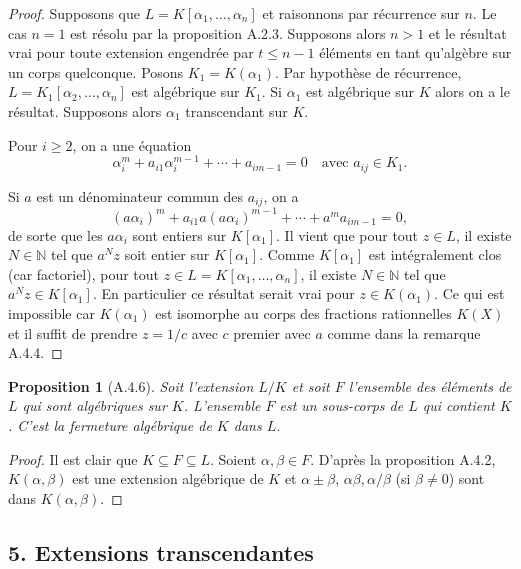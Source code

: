 \documentclass[12pts,a4paper]{report}
\newtheorem{proposition}{Proposition}
\begin{document}
\begin{proof}
Supposons que \( L = K[\alpha_1, \ldots, \alpha_n] \) et raisonnons par récurrence sur \( n \). Le cas \( n = 1 \) est résolu par la proposition A.2.3. Supposons alors \( n > 1 \) et le résultat vrai pour toute extension engendrée par \( t \leq n - 1 \) éléments en tant qu'algèbre sur un corps quelconque. Posons \( K_1 = K(\alpha_1) \). Par hypothèse de récurrence, \( L = K_1[\alpha_2, \ldots, \alpha_n] \) est algébrique sur \( K_1 \). Si \( \alpha_1 \) est algébrique sur \( K \) alors on a le résultat. Supposons alors \( \alpha_1 \) transcendant sur \( K \).

Pour \( i \geq 2 \), on a une équation
\[
\alpha_i^m + a_{i1}\alpha_i^{m-1} + \cdots + a_{im-1} = 0 \quad \text{avec } a_{ij} \in K_1.
\]

Si \( a \) est un dénominateur commun des \( a_{ij} \), on a
\[
(a\alpha_i)^m + a_{i1}a(a\alpha_i)^{m-1} + \cdots + a^{m}a_{im-1} = 0,
\]
de sorte que les \( a\alpha_i \) sont entiers sur \( K[\alpha_1] \). Il vient que pour tout \( z \in L \), il existe \( N \in \mathbb{N} \) tel que \( a^N z \) soit entier sur \( K[\alpha_1] \). Comme \( K[\alpha_1] \) est intégralement clos (car factoriel), pour tout \( z \in L = K[\alpha_1, \ldots, \alpha_n] \), il existe \( N \in \mathbb{N} \) tel que \( a^N z \in K[\alpha_1] \). En particulier ce résultat serait vrai pour \( z \in K(\alpha_1) \). Ce qui est impossible car \( K(\alpha_1) \) est isomorphe au corps des fractions rationnelles \( K(X) \) et il suffit de prendre \( z = 1/c \) avec \( c \) premier avec \( a \) comme dans la remarque A.4.4. \qedhere
\end{proof}

\begin{proposition}[A.4.6]
Soit l'extension \( L/K \) et soit \( F \) l'ensemble des éléments de \( L \) qui sont algébriques sur \( K \). L'ensemble \( F \) est un sous-corps de \( L \) qui contient \( K \). C'est la fermeture algébrique de \( K \) dans \( L \).
\end{proposition}

\begin{proof}
Il est clair que \( K \subseteq F \subseteq L \). Soient \( \alpha, \beta \in F \). D'après la proposition A.4.2, \( K(\alpha, \beta) \) est une extension algébrique de \( K \) et \( \alpha \pm \beta \), \( \alpha \beta, \alpha / \beta \) (si \( \beta \neq 0 \)) sont dans \( K(\alpha, \beta) \). \qedhere
\end{proof}

\subsection*{5. Extensions transcendantes}
\end{document}
